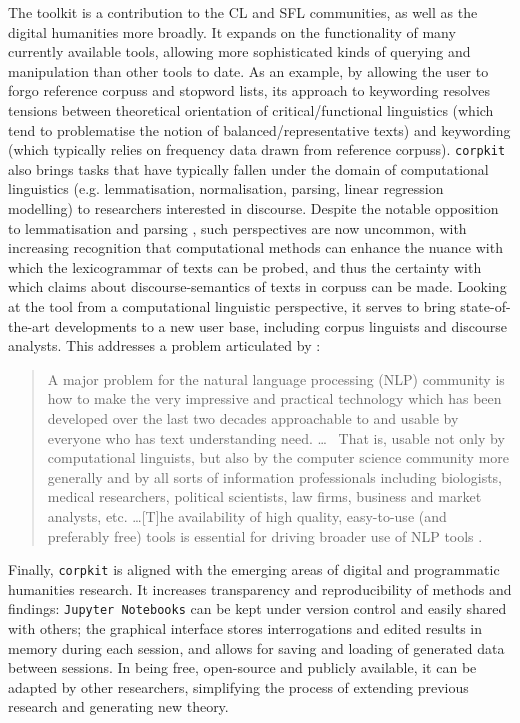 The toolkit is a contribution to the \gls{CL} and \gls{SFL} communities, as well as the digital humanities more broadly. It expands on the functionality of many currently available tools, allowing more sophisticated kinds of querying and manipulation than other tools to date. As an example, by allowing the user to forgo reference \glspl{corpus} and stopword lists, its approach to keywording resolves tensions between theoretical orientation of critical\slash functional linguistics (which tend to problematise the notion of balanced\slash representative texts) and keywording (which typically relies on frequency data drawn from reference \glspl{corpus}). \texttt{corpkit} also brings tasks that have typically fallen under the domain of computational linguistics (e.g. lemmatisation, normalisation, parsing, linear regression modelling) to researchers interested in discourse. Despite the notable opposition to lemmatisation and parsing \textcite[by e.g.][]{sinclair_trust_2004}, such perspectives are now uncommon, with increasing recognition that computational methods can enhance the nuance with which the \gls{lexicogrammar} of texts can be probed, and thus the certainty with which claims about \glspl{discourse-semantic} of texts in \glspl{corpus} can be made. Looking at the tool from a computational linguistic perspective, it serves to bring state\hyp{}of\hyp{}the\hyp{}art developments to a new user base, including corpus linguists and discourse analysts. This addresses a problem articulated by \citeauthor{de2008stanford}:

\begin{quote} \singlespacing \small
A major problem for the natural language processing (\gls{NLP}) community is how to make the very impressive and practical technology which has been developed over the last two decades approachable to and usable by everyone who has text understanding need. \dots~ That is, usable not only by computational linguists, but also by the computer science community more generally and by all sorts of information professionals including biologists, medical researchers, political scientists, law firms, business and market analysts, etc. \dots [T]he availability of high quality, easy\hyp{}to\hyp{}use (and preferably free) tools is essential for driving broader use of \gls{NLP} tools \parencite*[p.~1]{de2008stanford}.
\end{quote}

Finally, \texttt{corpkit} is aligned with the emerging areas of digital and programmatic humanities research. It increases transparency and reproducibility of methods and findings: \texttt{Jupyter Notebooks} can be kept under version control and easily shared with others; the graphical interface stores interrogations and edited results in memory during each session, and allows for saving and loading of generated data between sessions. In being free, open\hyp{}source and publicly available, it can be adapted by other researchers, simplifying the process of extending previous research and generating new theory.

